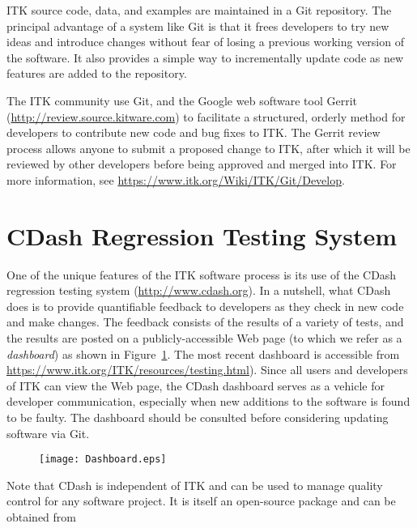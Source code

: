 ITK source code, data, and examples are maintained in a Git repository.  The
principal advantage of a system like Git is that it frees developers to try
new ideas and introduce changes without fear of losing a previous working
version of the software. It also provides a simple way to incrementally
update code as new features are added to the repository.

The ITK community use Git, and the Google web software tool Gerrit
(\url{http://review.source.kitware.com}) to facilitate a structured,
orderly method for developers to contribute new code and bug fixes to
ITK. The Gerrit review process allows anyone to submit a proposed
change to ITK, after which it will be reviewed by other developers
before being approved and merged into ITK.  For more information, see
\url{https://www.itk.org/Wiki/ITK/Git/Develop}.


\section{CDash Regression Testing System}
\label{sec:CDash}
\label{sec:QualityDashboard}


One of the unique features of the ITK software process is its use of the CDash
regression testing system (\url{http://www.cdash.org}). In a
nutshell, what CDash does is to provide quantifiable feedback to developers as
they check in new code and make changes. The feedback consists of the results
of a variety of tests, and the results are posted on a publicly-accessible
Web page (to which we refer as a \emph{dashboard}) as shown in
Figure~\ref{fig:Dashboard}. The most recent dashboard is accessible from
\url{https://www.itk.org/ITK/resources/testing.html}). Since all users and developers of
ITK can view the Web page, the CDash dashboard serves as a vehicle for
developer communication, especially when new additions to the software is
found to be faulty.  The dashboard should be consulted before considering
updating software via Git.


\begin{figure}[ht]
\centering
\texttt{[image: Dashboard.eps]}
\label{fig:Dashboard}
\end{figure}

Note that CDash is independent of ITK and can be used to manage quality
control for any software project. It is itself an open-source package and can
be obtained from

